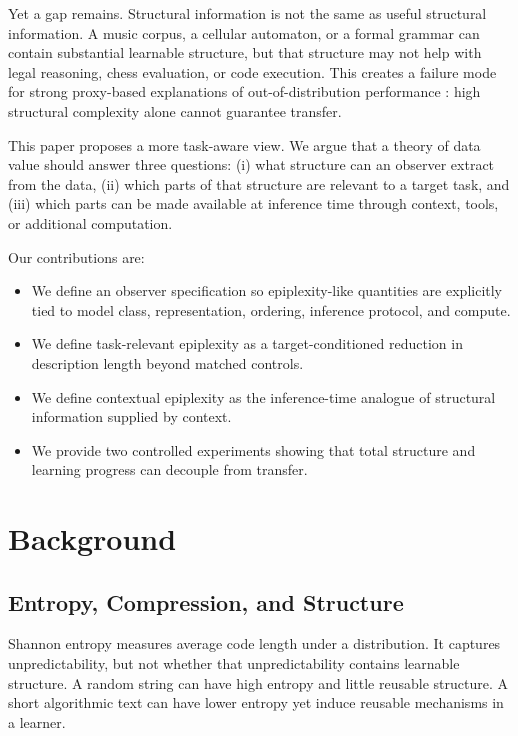 \documentclass[11pt]{article}
\begin{document}
Yet a gap remains. Structural information is not the same as useful structural information. A music corpus, a cellular automaton, or a formal grammar can contain substantial learnable structure, but that structure may not help with legal reasoning, chess evaluation, or code execution. This creates a failure mode for strong proxy-based explanations of out-of-distribution performance \citep{li2026counterexample}: high structural complexity alone cannot guarantee transfer.

This paper proposes a more task-aware view. We argue that a theory of data value should answer three questions: (i) what structure can an observer extract from the data, (ii) which parts of that structure are relevant to a target task, and (iii) which parts can be made available at inference time through context, tools, or additional computation.

Our contributions are:
\begin{itemize}[leftmargin=*]
  \item We define an observer specification so epiplexity-like quantities are explicitly tied to model class, representation, ordering, inference protocol, and compute.
  \item We define task-relevant epiplexity as a target-conditioned reduction in description length beyond matched controls.
  \item We define contextual epiplexity as the inference-time analogue of structural information supplied by context.
  \item We provide two controlled experiments showing that total structure and learning progress can decouple from transfer.
\end{itemize}

\section{Background}

\subsection{Entropy, Compression, and Structure}

Shannon entropy measures average code length under a distribution. It captures unpredictability, but not whether that unpredictability contains learnable structure. A random string can have high entropy and little reusable structure. A short algorithmic text can have lower entropy yet induce reusable mechanisms in a learner.
\end{document}
